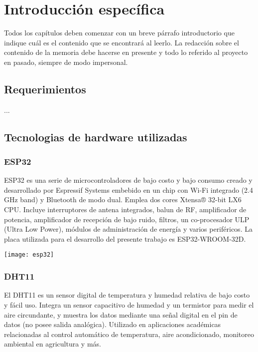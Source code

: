 

\chapter{Introducción específica} %

\label{Chapter2}

Todos los capítulos deben comenzar con un breve párrafo introductorio que indique cuál es el contenido que se encontrará al leerlo.  La redacción sobre el contenido de la memoria debe hacerse en presente y todo lo referido al proyecto en pasado, siempre de modo impersonal.

\section{Requerimientos}
...

\section{Tecnologias de hardware utilizadas}

\subsection{ESP32}

ESP32 es una serie de microcontroladores de bajo costo y bajo consumo creado y desarrollado por Espressif Systems embebido en un chip con Wi-Fi integrado (2.4 GHz band) y Bluetooth de modo dual. Emplea dos cores Xtensa® 32-bit LX6 CPU. Incluye interruptores de antena integrados, balun de RF, amplificador de potencia, amplificador de recepción de bajo ruido, filtros, un co-procesador ULP (Ultra Low Power),  módulos de administración de energía y varios periféricos.
La placa utilizada para el desarrollo del presente trabajo es ESP32-WROOM-32D.

\texttt{[image: esp32]}


\subsection{DHT11}

El DHT11 es un sensor digital de temperatura y humedad relativa de bajo costo y fácil uso. Integra un sensor capacitivo de humedad y un termistor para medir el aire circundante, y muestra los datos mediante una señal digital en el pin de datos (no posee salida analógica). Utilizado en aplicaciones académicas relacionadas al control automático de temperatura, aire acondicionado, monitoreo ambiental en agricultura y más.

